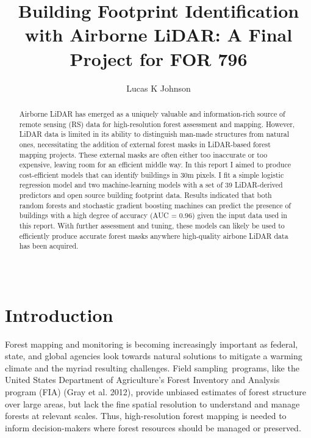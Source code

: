 \documentclass[review]{elsarticle} %
\begin{document}
\begin{frontmatter}

  \title{Building Footprint Identification with Airborne LiDAR: A Final Project for FOR 796}
    \author[]{Lucas K Johnson}
  
      
  \begin{abstract}
  Airborne LiDAR has emerged as a uniquely valuable and information-rich source
  of remote sensing (RS) data for high-resolution forest assessment and mapping.
  However, LiDAR data is limited in its ability to distinguish man-made
  structures from natural ones, necessitating the addition of external forest
  masks in LiDAR-based forest mapping projects.
  These external masks are often either too inaccurate or too expensive,
  leaving room for an efficient middle way.
  In this report I aimed to produce cost-efficient models that can identify
  buildings in 30m pixels.
  I fit a simple logistic regression model and two machine-learning
  models with a set of 39 LiDAR-derived predictors and open source building
  footprint data.
  Results indicated that both random forests and stochastic gradient boosting
  machines can predict the presence of buildings with a high degree of accuracy
  (AUC = 0.96) given the input data used in this report.
  With further assessment and tuning, these models can likely be used to
  efficiently produce accurate forest masks anywhere high-quality airbone LiDAR
  data has been acquired.

  \,
  \end{abstract}
  
 \end{frontmatter}

\hypertarget{introduction}{%
\section{Introduction}\label{introduction}}

Forest mapping and monitoring is becoming increasingly important as
federal, state, and global agencies look towards natural solutions
to mitigate a warming climate and the myriad resulting challenges.
Field sampling~programs,
like the United States Department of Agriculture's Forest Inventory and Analysis
program (FIA) (Gray et al. 2012),
provide unbiased estimates of forest structure over large areas,
but lack the fine spatial resolution to understand and manage forests at
relevant scales.
Thus, high-resolution forest mapping is needed to inform decision-makers where
forest resources should be managed or preserved.
\end{document}
